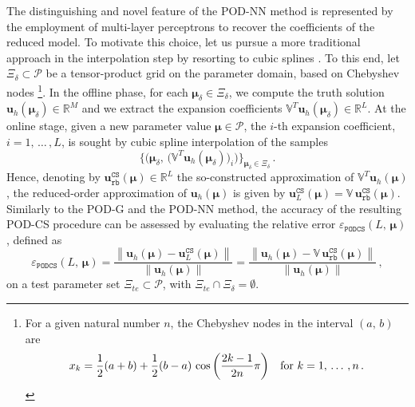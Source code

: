 \documentclass[12pt, a4paper, twoside, openright, notitlepage]{report}
\numberwithin{equation}{chapter}
\theoremstyle{theorem}
\theoremstyle{definition}
\theoremstyle{remark}
\theoremstyle{proposition}
\numberwithin{figure}{chapter}
\newcommand{\norm}[1]{\left\lVert#1\right\rVert}
\newcommand{\bg}[1]{\boldsymbol{#1}}
\begin{document}
		The distinguishing and novel feature of the POD-NN method is represented by the employment of multi-layer perceptrons to recover the coefficients of the reduced model. To motivate this choice, let us pursue a more traditional approach in the interpolation step by resorting to cubic splines \cite{Deb78}. To this end, let $\Xi_{\delta} \subset \mathcal{P}$ be a tensor-product grid on the parameter domain, based on Chebyshev nodes \footnote{For a given natural number $n$, the Chebyshev nodes in the interval $(a, \, b)$ are \[ x_k = \dfrac{1}{2}(a + b) + \dfrac{1}{2}(b - a) \, \cos \left( \dfrac{2k - 1}{2n} \pi \right) \hspace*{0.3cm} \text{for $k = 1, \, \ldots \, , n$} \, . \]}. In the offline phase, for each $\bg{\mu}_{\delta} \in \Xi_{\delta}$, we compute the truth solution $\mathbf{u}_h(\bg{\mu}_{\delta}) \in \mathbb{R}^M$ and we extract the expansion coefficients $\mathbb{V}^T \mathbf{u}_h(\bg{\mu}_{\delta}) \in \mathbb{R}^L$. At the online stage, given a new parameter value $\bg{\mu} \in \mathcal{P}$, the $i$-th expansion coefficient, $i = 1, \, \ldots \, , L$, is sought by cubic spline interpolation of the samples \[ \big\lbrace \big( \bg{\mu}_{\delta}, \, \big( \mathbb{V}^T \mathbf{u}_h(\bg{\mu}_{\delta}) \big)_i \big) \big\rbrace_{\bg{\mu}_{\delta} \in \Xi_{\delta}} \, . \] Hence, denoting by $\mathbf{u}_{\texttt{rb}}^{\texttt{CS}}(\bg{\mu}) \in \mathbb{R}^L$ the so-constructed approximation of $\mathbb{V}^T \mathbf{u}_h(\bg{\mu})$, the reduced-order approximation of $\mathbf{u}_h(\bg{\mu})$ is given by $\mathbf{u}_L^{\texttt{CS}}(\bg{\mu}) = \mathbb{V} \, \mathbf{u}_{\texttt{rb}}^{\texttt{CS}}(\bg{\mu})$. Similarly to the POD-G and the POD-NN method, the accuracy of the resulting POD-CS procedure can be assessed by evaluating the relative error $\varepsilon_{\texttt{PODCS}}^{}(L, \, \bg{\mu})$, defined as
		\begin{equation*}
			\label{eq:podcs-error}
			\varepsilon_{\texttt{PODCS}}^{}(L, \, \bg{\mu}) = \dfrac{\norm{\mathbf{u}_h(\bg{\mu}) - \mathbf{u}_L^{\texttt{CS}}(\bg{\mu})}}{\norm{\mathbf{u}_h(\bg{\mu})}} = \dfrac{\norm{\mathbf{u}_h(\bg{\mu}) - \mathbb{V} \, \mathbf{u}_{\texttt{rb}}^{\texttt{CS}}(\bg{\mu})}}{\norm{\mathbf{u}_h(\bg{\mu})}} \, ,
		\end{equation*}
		on a test parameter set $\Xi_{te} \subset \mathcal{P}$, with $\Xi_{te} \cap \Xi_{\delta} = \emptyset$.
		
\end{document}
